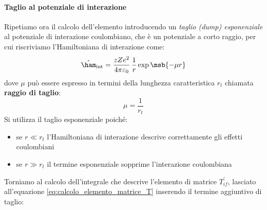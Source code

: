 \paragraph{Taglio al potenziale di interazione} Ripetiamo ora il calcolo
dell'elemento introducendo un \textit{taglio (dump) esponenziale} al potenziale
di interazione coulombiano, che è un potenziale a corto raggio, per cui
riscriviamo l'Hamiltoniana di interazione come:
\begin{equation}
  \hat{\ham}_{\text{int}} = \frac{zZe^2}{4 \pi \varepsilon_0} \, \frac{1}{r}
  \exp\msb{-\mu r}
\end{equation}
dove $\mu$ può essere espresso in termini della lunghezza caratteristica $r_t$
chiamata \textbf{raggio di taglio}:
\begin{equation}
  \mu = \frac{1}{r_t}
\end{equation}
Si utilizza il taglio esponenziale poiché:
\begin{itemize}
  \item se $r \ll r_t$ l'Hamiltoniana di interazione descrive correttamente gli
    effetti coulombiani
  \item se $r \gg r_t$ il termine esponenziale sopprime l'interazione
    coulombiana
\end{itemize}
Torniamo al calcolo dell'integrale che descrive l'elemento di matrice
$T_{if}^\prime$, lasciato all'equazione \ref{eq:calcolo_elemento_matrice_T}
inserendo il termine aggiuntivo di taglio:
